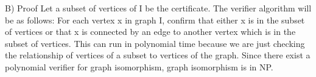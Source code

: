 \documentclass[11pt, oneside]{article}
\begin{document}
B)  Proof \newline
    Let a subset of vertices of I be the certificate. \newline
    The verifier algorithm will be as follows: \newline
    For each vertex x in graph I, confirm that either x is in the subset of vertices or that x is connected by an edge to another vertex which is in the subset of vertices. This can run in polynomial time because we are just checking the relationship of vertices of a subset to vertices of the graph. \newline
    Since there exist a polynomial verifier for graph isomorphism, graph isomorphism is in NP. \newline
\clearpage
\end{document}
